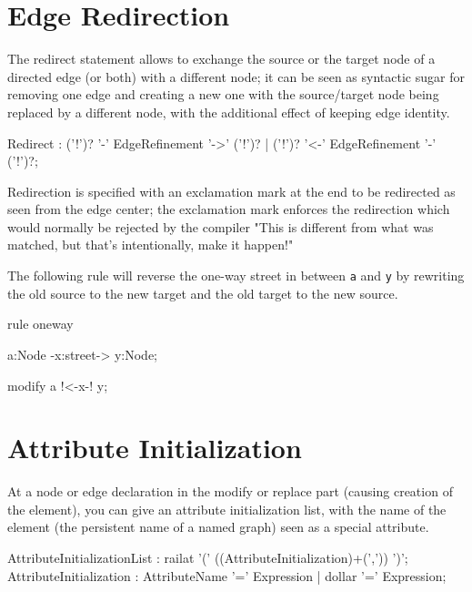 \section{Edge Redirection} \label{sec:redirect}

The redirect statement allows to exchange the source or the target node of a directed edge (or both) with a different node;
it can be seen as syntactic sugar for removing one edge and creating a new one with the source/target node being replaced by a different node, with the additional effect of keeping edge identity.

\begin{rail}
Redirect : ('!')? '-' EdgeRefinement '->' ('!')? | ('!')? '<-' EdgeRefinement '-' ('!')?;
\end{rail}

Redirection is specified with an exclamation mark at the end to be redirected as seen from the edge center;
the exclamation mark enforces the redirection which would normally be rejected by the compiler "This is different from what was matched, but that's intentionally, make it happen!"

\begin{example}
The following rule will reverse the one-way street in between \texttt{a} and \texttt{y} by rewriting the old source to the new target and the old target to the new source.
\begin{grgen}
rule oneway {
  a:Node -x:street-> y:Node;

  modify {
    a !<-x-! y;
  }
}
\end{grgen}
\end{example}


\section{Attribute Initialization} \label{sec:attribinitrule}

At a node or edge declaration in the modify or replace part (causing creation of the element), you can give an attribute initialization list, with the name of the element (the persistent name of a named graph) seen as a special attribute.

\begin{rail}
AttributeInitializationList : railat '(' ((AttributeInitialization)+(',')) ')';
AttributeInitialization : AttributeName '=' Expression | dollar '=' Expression;
\end{rail}

